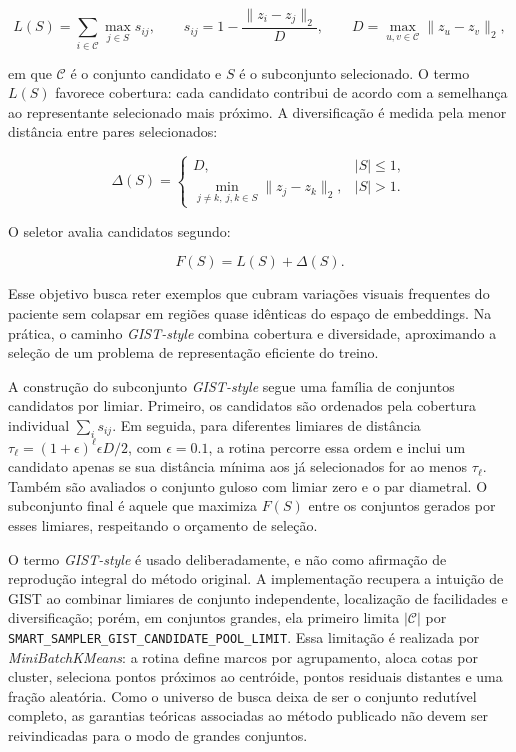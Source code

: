 \begin{equation}
    L(S) =
    \sum_{i\in\mathcal{C}}
    \max_{j\in S}
    s_{ij},
    \qquad
    s_{ij}=1-\frac{\lVert z_i-z_j\rVert_2}{D},
    \qquad
    D=\max_{u,v\in\mathcal{C}}\lVert z_u-z_v\rVert_2 ,
    \label{eq:gist_facility_location}
\end{equation}

em que $\mathcal{C}$ é o conjunto candidato e $S$ é o subconjunto selecionado.
O termo $L(S)$ favorece cobertura: cada candidato contribui de acordo com a
semelhança ao representante selecionado mais próximo. A diversificação é medida
pela menor distância entre pares selecionados:

\begin{equation}
    \Delta(S)=
    \begin{cases}
        D, & |S|\le 1,\\
        \min_{j\neq k,\ j,k\in S}\lVert z_j-z_k\rVert_2, & |S|>1.
    \end{cases}
    \label{eq:gist_diversity}
\end{equation}

O seletor avalia candidatos segundo:

\begin{equation}
    F(S)=L(S)+\Delta(S).
    \label{eq:gist_objective}
\end{equation}

Esse objetivo busca reter exemplos que cubram variações visuais frequentes do
paciente sem colapsar em regiões quase idênticas do espaço de embeddings. Na
prática, o caminho \textit{GIST-style} combina cobertura e diversidade, aproximando a
seleção de um problema de representação eficiente do treino.

A construção do subconjunto \textit{GIST-style} segue uma família de conjuntos candidatos
por limiar. Primeiro, os candidatos são ordenados pela cobertura individual
$\sum_i s_{ij}$. Em seguida, para diferentes limiares de distância
$\tau_\ell=(1+\epsilon)^\ell\epsilon D/2$, com $\epsilon=0.1$, a rotina percorre
essa ordem e inclui um candidato apenas se sua distância mínima aos já
selecionados for ao menos $\tau_\ell$. Também são avaliados o conjunto guloso
com limiar zero e o par diametral. O subconjunto final é aquele que maximiza
$F(S)$ entre os conjuntos gerados por esses limiares, respeitando o orçamento de
seleção.

O termo \textit{GIST-style} é usado deliberadamente, e não como afirmação de reprodução
integral do método original. A implementação recupera a intuição de GIST ao
combinar limiares de conjunto independente, localização de facilidades e
diversificação; porém, em conjuntos grandes, ela primeiro limita
$|\mathcal{C}|$ por \texttt{SMART\_SAMPLER\_GIST\_CANDIDATE\_POOL\_LIMIT}. Essa
limitação é realizada por \textit{MiniBatchKMeans}: a rotina define marcos por
agrupamento, aloca cotas por cluster, seleciona pontos próximos ao centróide,
pontos residuais distantes e uma fração aleatória. Como o universo de busca
deixa de ser o conjunto redutível completo, as garantias teóricas associadas ao
método publicado não devem ser reivindicadas para o modo de grandes conjuntos.

